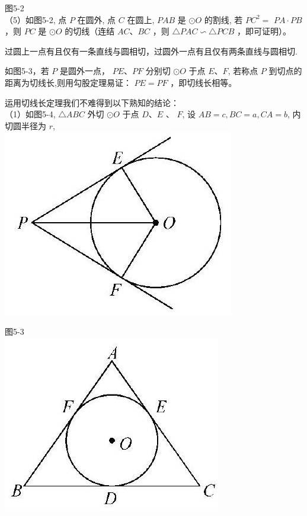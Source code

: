 \documentclass[10pt]{article}
\begin{document}
图5-2\\
（5）如图5-2, 点 $P$ 在圆外, 点 $C$ 在圆上, $P A B$ 是 $\odot O$ 的割线, 若 $P C^{2}=$ $P A \cdot P B$ ，则 $P C$ 是 $\odot O$ 的切线（连结 $A C 、 B C$ ，则 $\triangle P A C \backsim \triangle P C B$ ，即可证明）。

过圆上一点有且仅有一条直线与圆相切，过圆外一点有且仅有两条直线与圆相切.

如图5-3，若 $P$ 是圆外一点， $P E 、 P F$ 分别切 $\odot O$ 于点 $E 、 F$, 若称点 $P$ 到切点的距离为切线长,则用勾股定理易证： $P E=P F$ ，即切线长相等。

运用切线长定理我们不难得到以下熟知的结论：\\
（1）如图5-4, $\triangle A B C$ 外切 $\odot O$ 于点 $D 、 E$ 、 $F$, 设 $A B=c, B C=a, C A=b$, 内切圆半径为 $r$,\\
\includegraphics[max width=\textwidth, center]{2024_10_30_66b8e5e701da2093c133g-034(2)}

图5-3\\
\includegraphics[max width=\textwidth, center]{2024_10_30_66b8e5e701da2093c133g-035(3)}
\end{document}
